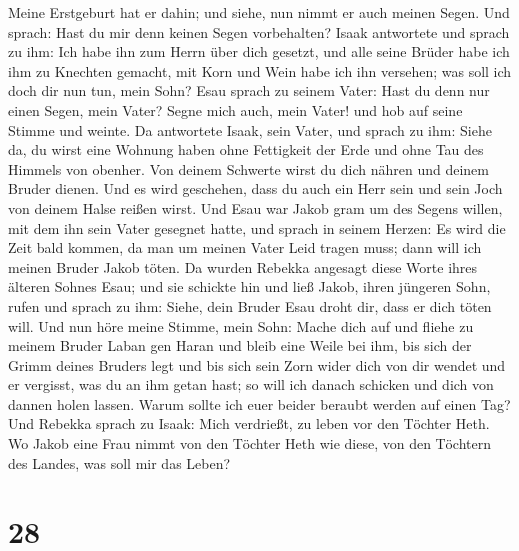 Meine Erstgeburt hat er dahin; und siehe, nun nimmt er auch meinen
Segen. Und sprach: Hast du mir denn keinen Segen vorbehalten?
 Isaak antwortete und sprach zu ihm: Ich habe ihn zum
Herrn über dich gesetzt, und alle seine Brüder habe ich ihm zu Knechten
gemacht, mit Korn und Wein habe ich ihn versehen; was soll ich doch dir
nun tun, mein Sohn?  Esau sprach zu seinem Vater: Hast du
denn nur einen Segen, mein Vater? Segne mich auch, mein Vater! und hob
auf seine Stimme und weinte.  Da antwortete Isaak, sein
Vater, und sprach zu ihm: Siehe da, du wirst eine Wohnung haben ohne
Fettigkeit der Erde und ohne Tau des Himmels von obenher.
 Von deinem Schwerte wirst du dich nähren und deinem
Bruder dienen. Und es wird geschehen, dass du auch ein Herr sein und
sein Joch von deinem Halse reißen wirst.  Und Esau war
Jakob gram um des Segens willen, mit dem ihn sein Vater gesegnet hatte,
und sprach in seinem Herzen: Es wird die Zeit bald kommen, da man um
meinen Vater Leid tragen muss; dann will ich meinen Bruder Jakob töten.
 Da wurden Rebekka angesagt diese Worte ihres älteren
Sohnes Esau; und sie schickte hin und ließ Jakob, ihren jüngeren Sohn,
rufen und sprach zu ihm: Siehe, dein Bruder Esau droht dir, dass er dich
töten will.  Und nun höre meine Stimme, mein Sohn: Mache
dich auf und fliehe zu meinem Bruder Laban gen Haran  und
bleib eine Weile bei ihm, bis sich der Grimm deines Bruders legt
 und bis sich sein Zorn wider dich von dir wendet und er
vergisst, was du an ihm getan hast; so will ich danach schicken und dich
von dannen holen lassen. Warum sollte ich euer beider beraubt werden auf
einen Tag?  Und Rebekka sprach zu Isaak: Mich verdrießt,
zu leben vor den Töchter Heth. Wo Jakob eine Frau nimmt von den Töchter
Heth wie diese, von den Töchtern des Landes, was soll mir das Leben?

\hypertarget{section-27}{%
\section{28}\label{section-27}}

